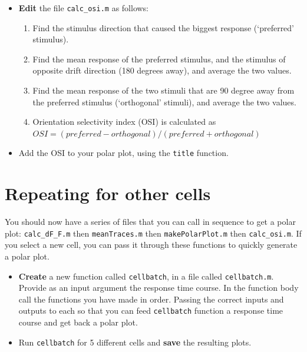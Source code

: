 \documentclass[paper=a4, fontsize=11pt]{scrartcl} %
\numberwithin{equation}{section} %
\numberwithin{figure}{section} %
\numberwithin{table}{section} %
\begin{document}
\begin{itemize}
\item \textbf{Edit} the file \texttt{calc\_osi.m} as follows:
  \begin{enumerate}
  \item Find the stimulus direction that caused the biggest response (`preferred' stimulus).
  \item Find the mean response of the preferred stimulus, and the stimulus of opposite drift direction (180 degrees away), and average the two values.
  \item Find the mean response of the two stimuli that are 90 degree away from the preferred stimulus (`orthogonal' stimuli), and average the two values.
  \item Orientation selectivity index (OSI) is calculated as \\ $OSI = {\left(preferred - orthogonal\right)} / {\left(preferred + orthogonal\right)}$
  \end{enumerate}
\item Add the OSI to your polar plot, using the \texttt{title} function.
\end{itemize}



\section{Repeating for other cells}

You should now have a series of files that you can call in sequence to get a polar plot: \texttt{calc\_dF\_F.m} then \texttt{meanTraces.m} then \texttt{makePolarPlot.m} then \texttt{calc\_osi.m}. If you select a new cell, you can pass it through these functions to quickly generate a polar plot. 

\begin{itemize}
\item \textbf{Create} a new function called \texttt{cellbatch}, in a file called \texttt{cellbatch.m}. Provide as an input argument the response time course. In the function body call the functions you have made in order. Passing the correct inputs and outputs to each so that you can feed \texttt{cellbatch} function a response time course and get back a polar plot.
\item Run \texttt{cellbatch} for 5 different cells and \textbf{save} the resulting plots.
\end{itemize}
\end{document}
